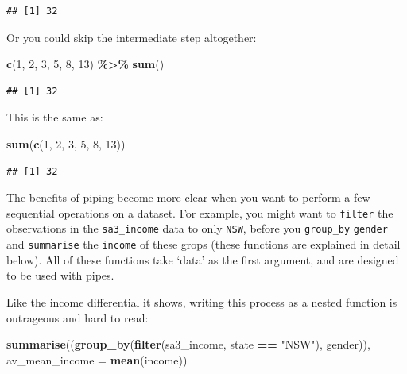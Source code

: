 \documentclass[
]{book}
\newenvironment{Shaded}{\begin{snugshade}}{\end{snugshade}}
\newcommand{\DataTypeTok}[1]{\textcolor[rgb]{0.13,0.29,0.53}{#1}}
\newcommand{\DecValTok}[1]{\textcolor[rgb]{0.00,0.00,0.81}{#1}}
\newcommand{\KeywordTok}[1]{\textcolor[rgb]{0.13,0.29,0.53}{\textbf{#1}}}
\newcommand{\NormalTok}[1]{#1}
\newcommand{\OperatorTok}[1]{\textcolor[rgb]{0.81,0.36,0.00}{\textbf{#1}}}
\newcommand{\StringTok}[1]{\textcolor[rgb]{0.31,0.60,0.02}{#1}}
\begin{document}
\begin{verbatim}
## [1] 32
\end{verbatim}

Or you could skip the intermediate step altogether:

\begin{Shaded}
\begin{Highlighting}[]
\KeywordTok{c}\NormalTok{(}\DecValTok{1}\NormalTok{, }\DecValTok{2}\NormalTok{, }\DecValTok{3}\NormalTok{, }\DecValTok{5}\NormalTok{, }\DecValTok{8}\NormalTok{, }\DecValTok{13}\NormalTok{) }\OperatorTok{\%\textgreater{}\%}\StringTok{ }
\StringTok{  }\KeywordTok{sum}\NormalTok{()}
\end{Highlighting}
\end{Shaded}

\begin{verbatim}
## [1] 32
\end{verbatim}

This is the same as:

\begin{Shaded}
\begin{Highlighting}[]
\KeywordTok{sum}\NormalTok{(}\KeywordTok{c}\NormalTok{(}\DecValTok{1}\NormalTok{, }\DecValTok{2}\NormalTok{, }\DecValTok{3}\NormalTok{, }\DecValTok{5}\NormalTok{, }\DecValTok{8}\NormalTok{, }\DecValTok{13}\NormalTok{))}
\end{Highlighting}
\end{Shaded}

\begin{verbatim}
## [1] 32
\end{verbatim}

The benefits of piping become more clear when you want to perform a few sequential operations on a dataset. For example, you might want to \texttt{filter} the observations in the \texttt{sa3\_income} data to only \texttt{NSW}, before you \texttt{group\_by} \texttt{gender} and \texttt{summarise} the \texttt{income} of these grops (these functions are explained in detail below). All of these functions take `data' as the first argument, and are designed to be used with pipes.

Like the income differential it shows, writing this process as a nested function is outrageous and hard to read:

\begin{Shaded}
\begin{Highlighting}[]
\KeywordTok{summarise}\NormalTok{((}\KeywordTok{group\_by}\NormalTok{(}\KeywordTok{filter}\NormalTok{(sa3\_income, state }\OperatorTok{==}\StringTok{ "NSW"}\NormalTok{), gender)), }\DataTypeTok{av\_mean\_income =} \KeywordTok{mean}\NormalTok{(income))}
\end{Highlighting}
\end{Shaded}
\end{document}
